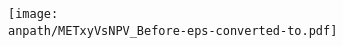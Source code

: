 \begin{frame}
\begin{columns}[T]
\begin{column}{0.45\textwidth}
\begin{figure}
				\begin{subfigure}[t]{\textwidth}
				\end{subfigure}
				\newline
				\begin{subfigure}[t]{\textwidth}
					\texttt{[image: \\anpath/METxyVsNPV\_Before-eps-converted-to.pdf]}
				\end{subfigure}
			\end{figure}
		\end{column}
	\end{columns}
\end{frame}


